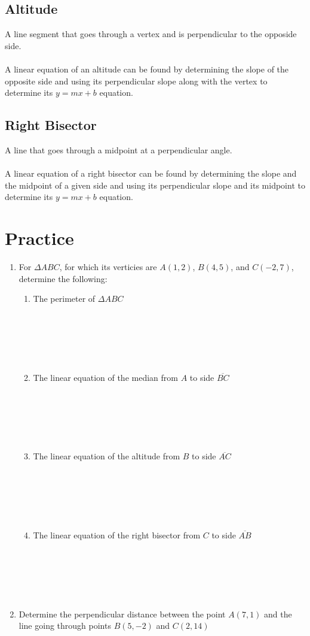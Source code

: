 \documentclass[12pt]{article}
\begin{document}
\subsection{Altitude}
A line segment that goes through a vertex and is perpendicular to the opposide side. \\ \\
A linear equation of an altitude can be found by determining the slope of the opposite side and using its perpendicular slope along with the vertex to determine its $y = mx + b$ equation.

\subsection{Right Bisector}
A line that goes through a midpoint at a perpendicular angle. \\ \\
A linear equation of a right bisector can be found by determining the slope and the midpoint of a given side and using its perpendicular slope and its midpoint to determine its $y = mx + b$ equation.    

\newcommand{\spacing}{\\ \\ \\ \\ \\ \\}
\section{Practice}
\begin{enumerate}
    \item For $\Delta ABC$, for which its verticies are $A(1, 2)$, $B(4, 5)$, and $C(-2, 7)$, determine the following:
    \begin{enumerate}
        \item The perimeter of $\Delta ABC$ \spacing
        \item The linear equation of the median from $A$ to side $\overline{BC}$ \spacing
        \item The linear equation of the altitude from $B$ to side $\overline{AC}$ \spacing
        \item The linear equation of the right bisector from $C$ to side $\overline{AB}$ \spacing
    \end{enumerate}

    \item Determine the perpendicular distance between the point $A(7, 1)$ and the line going through points $B(5, -2)$ and $C(2, 14)$ \spacing
\end{enumerate}
\end{document}
